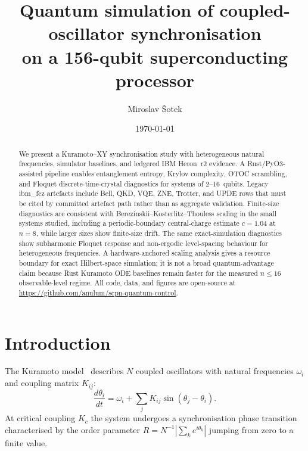 \documentclass[twocolumn,prl,superscriptaddress,showpacs,floatfix]{revtex4-2}
\begin{document}
\title{Quantum simulation of coupled-oscillator synchronisation\\
on a 156-qubit superconducting processor}

\author{Miroslav \v{S}otek}

\date{\today}

\begin{abstract}
We present a Kuramoto--XY synchronisation study with heterogeneous natural
frequencies, simulator baselines, and ledgered IBM Heron~r2 evidence. A
Rust/PyO3-assisted pipeline enables entanglement entropy, Krylov complexity,
OTOC scrambling, and Floquet discrete-time-crystal diagnostics for systems
of 2--16~qubits. Legacy ibm\_fez artefacts include
Bell, QKD, VQE, ZNE, Trotter, and UPDE rows that must be cited by committed
artefact path rather than as aggregate validation. Finite-size diagnostics are
consistent with Berezinskii--Kosterlitz--Thouless scaling in the small
systems studied, including a periodic-boundary central-charge estimate
$c = 1.04$ at $n = 8$, while larger sizes show finite-size drift. The
same exact-simulation diagnostics show subharmonic Floquet response and
non-ergodic level-spacing behaviour for heterogeneous frequencies. A
hardware-anchored scaling analysis gives a resource boundary for exact
Hilbert-space simulation; it is not a broad quantum-advantage claim because
Rust Kuramoto ODE baselines remain faster for the measured $n \leq 16$
observable-level regime.
All code, data, and figures are open-source at
\url{https://github.com/anulum/scpn-quantum-control}.
\end{abstract}

\maketitle

\section{Introduction}

The Kuramoto model~\cite{Kuramoto1984} describes $N$ coupled oscillators
with natural frequencies $\omega_i$ and coupling matrix $K_{ij}$:
%
\begin{equation}\label{eq:kuramoto}
  \frac{d\theta_i}{dt} = \omega_i
    + \sum_j K_{ij}\sin(\theta_j - \theta_i).
\end{equation}
%
At critical coupling $K_c$ the system undergoes a synchronisation phase
transition characterised by the order parameter
$R = N^{-1}|\sum_k e^{i\theta_k}|$ jumping from zero to a finite value.
\end{document}
